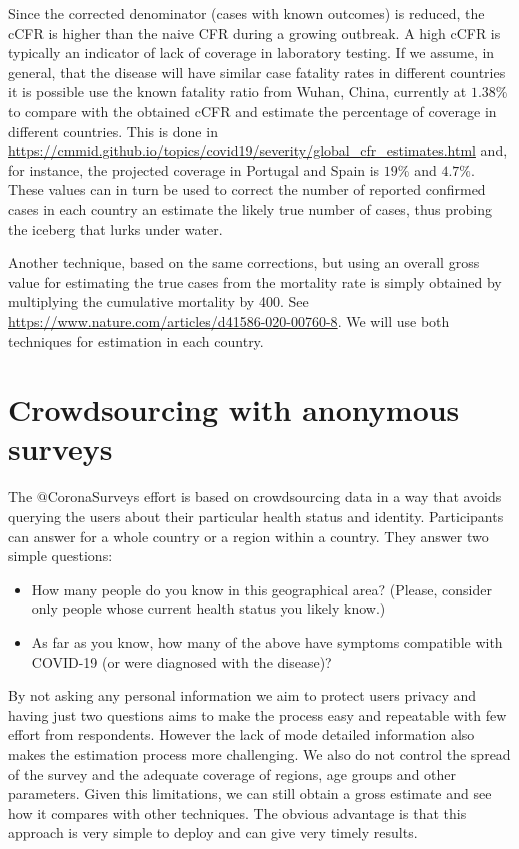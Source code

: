 \documentclass{article}
\begin{document}
Since the corrected denominator (cases with known outcomes) is reduced, the cCFR is higher than the naive CFR during a growing outbreak. A high cCFR is typically an indicator of lack of coverage in laboratory testing. If we assume, in general, that the disease will have similar case fatality rates in different countries it is possible use the known fatality ratio from Wuhan, China, currently at $1.38\%$
to compare with the obtained cCFR and estimate the percentage of coverage in different countries. This is done in \url{https://cmmid.github.io/topics/covid19/severity/global_cfr_estimates.html} and, for instance, the projected coverage in Portugal and Spain is $19\%$ and $4.7\%$. These values can in turn be used to correct the number of reported confirmed cases in each country an estimate the likely true number of cases, thus probing the iceberg that lurks under water.

Another technique, based on the same corrections, but using an overall gross value for estimating the true cases from the mortality rate is simply obtained by multiplying the cumulative mortality by 400. See \url{https://www.nature.com/articles/d41586-020-00760-8}. We will use both techniques for estimation in each country.

\section{Crowdsourcing with anonymous surveys}

The $@$CoronaSurveys effort is based on crowdsourcing data in a way that avoids querying the users about their particular health status and identity. Participants can answer for a whole country or a region within a country. They answer two simple questions: 

\begin{itemize}
\item How many people do you know in this geographical area? (Please, consider only people whose current health status you likely know.)
\item As far as you know, how many of the above have symptoms compatible with COVID-19 (or were diagnosed with the disease)?
\end{itemize}

By not asking any personal information we aim to protect users privacy and having just two questions aims to make the process easy and repeatable with few effort from respondents. However the lack of mode detailed information also makes the estimation process more challenging. We also do not control the spread of the survey and the adequate coverage of regions, age groups and other parameters.
Given this limitations, we can still obtain a gross estimate and see how it compares with other techniques. The obvious advantage is that this approach is very simple to deploy and can give very timely results. 
\end{document}
